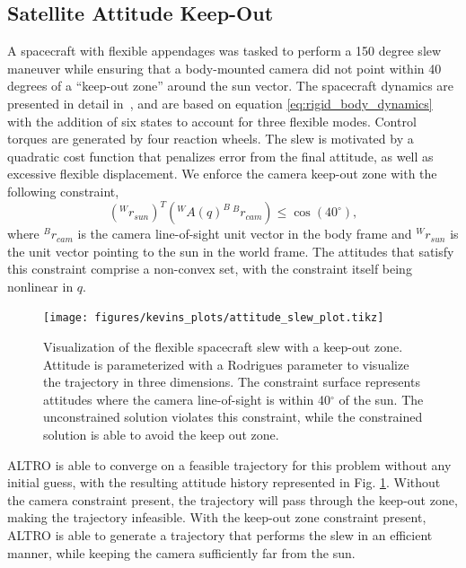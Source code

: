 \documentclass[letterpaper, 10 pt, conference]{ieeeconf}  %
\newcommand{\inframe}[2]{{}^{#1}\!#2}
\newcommand{\toframe}[3]{\inframe{#1}{#3}^{#2}}
\newcommand{\todo}[1]{\textcolor{red}{TODO: #1}}
\begin{document}
    \subsection{Satellite Attitude Keep-Out}
        A spacecraft with flexible appendages was tasked to perform a 150 degree slew maneuver while
        ensuring that a body-mounted camera did not point within 40 degrees of a  ``keep-out zone'' around the sun vector. The spacecraft dynamics are presented in detail in~\cite{Tracy2020}, and are based
        on equation \eqref{eq:rigid_body_dynamics} with the addition of six states to account for three flexible modes. Control torques are generated by four reaction wheels.  The slew is motivated by a quadratic cost function that penalizes error from the final attitude, as well as excessive flexible displacement. 
        We enforce the camera keep-out zone with the following constraint,
        \begin{equation}
            \left(\inframe{W}{r_{sun}}\right)^T 
            \left(\toframe{W}{B}{A(q)} \, \inframe{B}{r_{cam}} \right) \leq \cos(40 ^\circ) ,
        \end{equation}
        where $^Br_{cam}$ is the camera line-of-sight unit vector in the body frame and $^Wr_{sun}$ is the unit vector pointing to the sun in the world frame. The attitudes that satisfy this constraint comprise a non-convex set, with the
        constraint itself being nonlinear in $q$.
        \begin{figure}[ht]
            \centering
            \texttt{[image: figures/kevins\_plots/attitude\_slew\_plot.tikz]}
            \caption{Visualization of the flexible spacecraft slew with a keep-out zone. Attitude is parameterized with a Rodrigues parameter to visualize the trajectory in three dimensions. The constraint surface represents attitudes where the camera line-of-sight is within 40$^\circ$ of the sun. The unconstrained solution violates this constraint, while the constrained solution is able to avoid the keep out zone.}
            \label{fig:keepout}
        \end{figure}
        
        ALTRO is able to converge on a feasible trajectory for this problem without any initial guess, with the resulting attitude history represented in Fig. \ref{fig:keepout}. Without the camera constraint present, the trajectory will pass through the keep-out
        zone, making the trajectory infeasible. With the keep-out zone constraint present, ALTRO
        is able to generate a trajectory that performs the slew in an efficient manner, while
        keeping the camera sufficiently far from the sun. 
\end{document}
